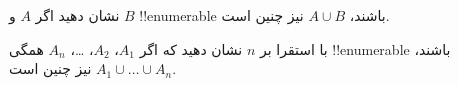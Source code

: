\documentclass[../../../include/open-logic-section]{subfiles}
\begin{document}
\begin{prob}
نشان دهید اگر $A$ و $B$ !!{enumerable} باشند، $A \cup B$ نیز چنین است.
\end{prob}

\begin{prob}
با استقرا بر $n$ نشان دهید که اگر $A_1$، $A_2$، \dots، $A_n$ همگی
!!{enumerable} باشند، $A_1 \cup \dots \cup A_n$ نیز چنین است.
\end{prob}
\end{document}
